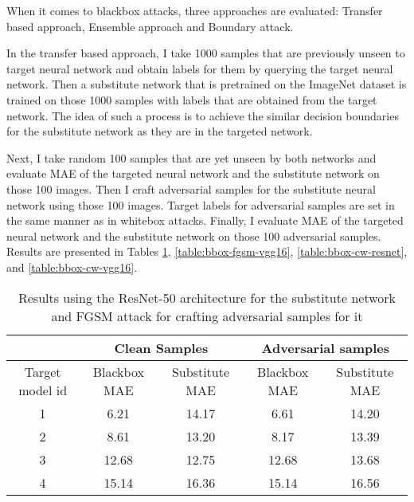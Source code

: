 When it comes to blackbox attacks, three approaches are evaluated: Transfer based approach, Ensemble approach and Boundary attack.

In the transfer based approach, I take 1000 samples that are previously unseen to target neural network and obtain labels for them by querying the target neural network. Then a substitute network that is pretrained on the ImageNet dataset is trained on those 1000 samples with labels that are obtained from the target network. The idea of such a process is to achieve the similar decision boundaries for the substitute network as they are in the targeted network.

Next, I take random 100 samples that are yet unseen by both networks and evaluate  MAE of the targeted neural network and the substitute network on those 100 images. Then I craft adversarial samples for the substitute neural network using those 100 images. Target labels for adversarial samples are set in the same manner as in whitebox attacks. Finally, I evaluate MAE of the targeted neural network and the substitute network on those 100 adversarial samples. Results are presented in Tables \ref{table:bbox-fgsm-resnet}, \ref{table:bbox-fgsm-vgg16}, \ref{table:bbox-cw-resnet}, and \ref{table:bbox-cw-vgg16}. 


\begin{table}[]
\begin{tabular}{|c|c|c|c|c|}
\hline
 & \multicolumn{2}{c|}{Clean Samples} & \multicolumn{2}{c|}{Adversarial samples} \\ \hline
Target model id & Blackbox MAE & Substitute MAE & Blackbox MAE & Substitute MAE \\ \hline
1 & 6.21 & 14.17 & 6.61 & 14.20 \\ \hline
2 & 8.61 & 13.20  &  8.17 & 13.39  \\ \hline
3 & 12.68 & 12.75 & 12.68  & 13.68 \\ \hline
4 &  15.14 & 16.36 &  15.14 & 16.56 \\ \hline
\end{tabular}
\caption{Results using the ResNet-50 architecture for the substitute network and FGSM attack for crafting adversarial samples for it}
\label{table:bbox-fgsm-resnet}
\end{table}


